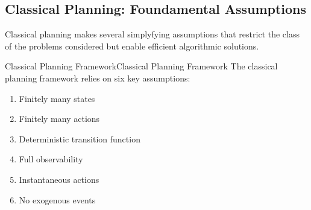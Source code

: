 \documentclass[a4paper]{article}
\theoremstyle{definition}
\begin{document}
\subsection{Classical Planning: Foundamental Assumptions}
Classical planning makes several simplyfying assumptions that restrict the class of the problems
considered but enable efficient algorithmic solutions.
\begin{definition}{Classical Planning Framework}{Classical Planning Framework}
The classical planning framework relies on six key assumptions:
\begin{enumerate}
    \item Finitely many states
    \item Finitely many actions
    \item Deterministic transition function
    \item Full observability
    \item Instantaneous actions
    \item No exogenous events
\end{enumerate}
\end{definition}
\end{document}
